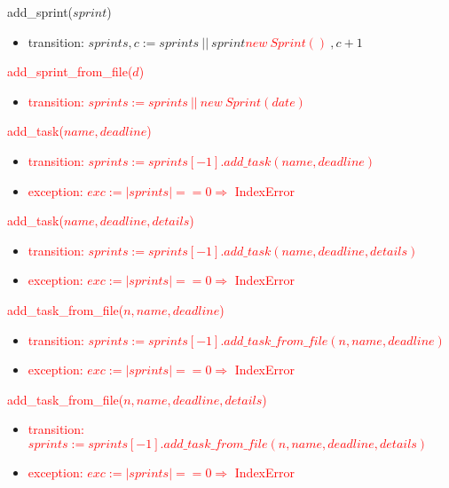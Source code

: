 \documentclass[12pt, titlepage]{article}
\begin{document}
\noindent add\_sprint(\sout{$sprint$})
\begin{itemize}
    \item transition: $sprints, c := sprints\ ||\ $\sout{$sprint$}\textcolor{red}{$new \ Sprint() \ $}$, c + 1$
\end{itemize}

\noindent \textcolor{red}{add\_sprint\_from\_file($d$)}
\begin{itemize}
    \item \textcolor{red}{transition: $sprints := sprints \ || \ new \ Sprint(date)$}
\end{itemize}

\noindent \textcolor{red}{add\_task($name, deadline$)}
\begin{itemize}
    \item \textcolor{red}{transition: $sprints := sprints[-1].add\_task(name,deadline)$}
    \item \textcolor{red}{exception: $exc := |sprints| == 0 \Rightarrow$ IndexError}
\end{itemize}

\noindent \textcolor{red}{add\_task($name, deadline, details$)}
\begin{itemize}
    \item \textcolor{red}{transition: $sprints := sprints[-1].add\_task(name,deadline,details)$}
    \item \textcolor{red}{exception: $exc := |sprints| == 0 \Rightarrow$ IndexError}
\end{itemize}

\noindent \textcolor{red}{add\_task\_from\_file($n, name, deadline$)}
\begin{itemize}
    \item \textcolor{red}{transition: $sprints := sprints[-1].add\_task\_from\_file(n,name,deadline)$}
    \item \textcolor{red}{exception: $exc := |sprints| == 0 \Rightarrow$ IndexError}
\end{itemize}

\noindent \textcolor{red}{add\_task\_from\_file($n, name, deadline, details$)}
\begin{itemize}
    \item \textcolor{red}{transition: $sprints := sprints[-1].add\_task\_from\_file(n,name,deadline,details)$}
    \item \textcolor{red}{exception: $exc := |sprints| == 0 \Rightarrow$ IndexError}
\end{itemize}
\end{document}

